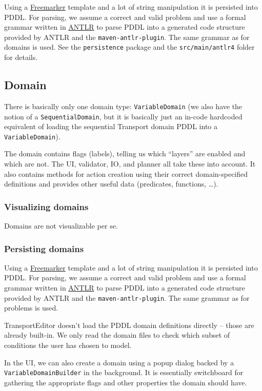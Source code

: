 Using a \href{http://freemarker.org/}{Freemarker} template and a lot of string manipulation it is persisted into PDDL.
For parsing, we assume a correct and valid problem and use a formal grammar written in \href{http://www.antlr.org/}{ANTLR}
to parse PDDL into a generated code structure provided by ANTLR and the \texttt{maven-antlr-plugin}. The same grammar as for
domains is used. See the \texttt{persistence} package and the \texttt{src/main/antlr4} folder for details.

\subsection*{Domain}
There is basically only one domain type: \texttt{VariableDomain} (we also have the notion of a \texttt{SequentialDomain},
but it is basically just an in-code hardcoded equivalent of loading the sequential Transport domain PDDL
into a \texttt{VariableDomain}).

The domain contains flags (labels), telling us which ``layers'' are enabled and which are not.
The UI, validator, IO, and planner all take these into account.
It also contains methods for action creation using their correct domain-specified definitions
and provides other useful data (predicates, functions, \ldots).

\subsubsection*{Visualizing domains}

Domains are not visualizable per se.

\subsubsection*{Persisting domains}
Using a \href{http://freemarker.org/}{Freemarker} template and a lot of string manipulation it is persisted into PDDL.
For parsing, we assume a correct and valid problem and use a formal grammar written in \href{http://www.antlr.org/}{ANTLR}
to parse PDDL into a generated code structure provided by ANTLR and the \texttt{maven-antlr-plugin}. The same grammar as for
problems is used.

TransportEditor doesn't load the PDDL domain definitions directly -- those are already built-in.
We only read the domain files to check which subset of conditions the user has chosen to model.

In the UI, we can also create a domain using a popup dialog backed by a \texttt{VariableDomainBuilder} in the background.
It is essentially switchboard for gathering the appropriate flags and other properties the domain should have.

